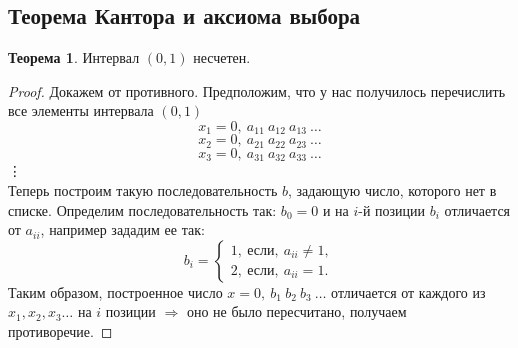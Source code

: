 \documentclass[a4paper, 12pt]{article}
\newcommand\tab[1][.5cm]{\hspace*{#1}}
\theoremstyle{definition}
\newtheorem*{theorem}{Теорема}
\begin{document}
        \subsection{Теорема Кантора и аксиома выбора}
        \begin{theorem}
            Интервал $(0,1)$ несчетен.
        \end{theorem}
        \begin{proof}
            Докажем от противного. Предположим, что у нас получилось перечислить все элементы интервала $(0,1)$ 
            \[x_1=0,\ a_{11}\ a_{12}\ a_{13}\ \dots\]
            \[x_2=0,\ a_{21}\ a_{22}\ a_{23}\ \dots\]
            \[x_3=0,\ a_{31}\ a_{32}\ a_{33}\ \dots\]
            \tab[6.35cm] \vdots \\
            Теперь построим такую последовательность $b$, задающую число, которого нет в списке. Определим последовательность так: $b_0 = 0$ и на $i$-й позиции $b_i$ отличается от $a_{ii}$, например зададим ее так:
            \[b_i=
            \begin{cases}
                1,\ \text{если},\ a_{ii}\ne 1,\\
                2,\ \text{если},\ a_{ii}=1.
            \end{cases}\]
            Таким образом, построенное число $x = 0,\ b_1\ b_2\ b_3\ \dots$ отличается от каждого из $x_1,x_2,x_3\dots$ на $i$ позиции $\Rightarrow$ оно не было пересчитано, получаем противоречие.
        \end{proof} 
\end{document}
